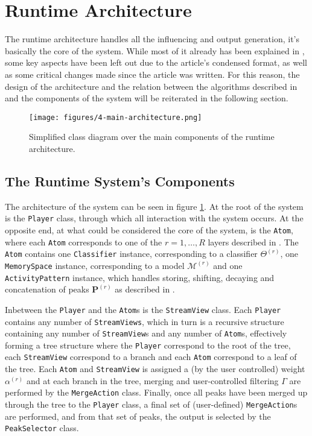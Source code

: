 \section{Runtime Architecture}\label{sec:4-main-architecture}
The runtime architecture handles all the influencing and output generation, it's basically the core of the system. While most of it already has been explained in \cite{borg_2019}, some key aspects have been left out due to the article's condensed format, as well as some critical changes made since the article was written. For this reason, the design of the architecture and the relation between the algorithms described in \cite{somaxtheory2021} and the components of the system will be reiterated in the following section.

 \begin{figure}[h]
    \centering        
 	\texttt{[image: figures/4-main-architecture.png]}
    \caption{Simplified class diagram over the main components of the runtime architecture.}
    \label{fig:4-main-architecture}
\end{figure}

\subsection{The Runtime System's Components}\label{sec:4-main-architecture-components}
The architecture of the system can be seen in figure \ref{fig:4-main-architecture}. At the root of the system is the \texttt{Player} class, through which all interaction with the system occurs. At the opposite end, at what could be considered the core of the system, is the \texttt{Atom}, where each \texttt{Atom} corresponds to one of the $r = 1,\dots,R$ layers described in \cite{somaxtheory2021}. The \texttt{Atom} contains one \texttt{Classifier} instance, corresponding to a classifier $\Theta^{(r)}$, one \texttt{MemorySpace} instance, corresponding to a model $\mathcal M^{(r)}$ and one \texttt{ActivityPattern} instance, which handles storing, shifting, decaying and concatenation of peaks $\bm P^{(r)}$ as described in \cite{somaxtheory2021}.
 
 Inbetween the \texttt{Player} and the \texttt{Atom}s is the \texttt{StreamView} class. Each \texttt{Player} contains any number of \texttt{StreamViews}, which in turn is a recursive structure containing any number of \texttt{StreamView}s and any number of \texttt{Atom}s, effectively forming a tree structure where the \texttt{Player} correspond to the root of the tree, each \texttt{StreamView} correspond to a branch and each \texttt{Atom} correspond to a leaf of the tree. Each \texttt{Atom} and \texttt{StreamView} is assigned a (by the user controlled) weight $\alpha^{(r)}$ and at each branch in the tree, merging and user-controlled filtering $\Gamma$ are performed by the \texttt{MergeAction} class. Finally, once all peaks have been merged up through the tree to the \texttt{Player} class, a final set of (user-defined) \texttt{MergeAction}s are performed, and from that set of peaks, the output is selected by the \texttt{PeakSelector} class.
 
